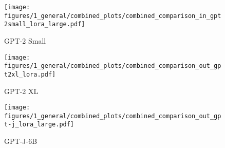 \begin{figure*}[h!]
    \centering
    \begin{subfigure}[t]{0.32\textwidth}
        \centering
        \texttt{[image: figures/1\_general/combined\_plots/combined\_comparison\_in\_gpt2small\_lora\_large.pdf]}
        \caption{GPT-2 Small }
        \label{fig:gpt2small_lora}
    \end{subfigure}
    \begin{subfigure}[t]{0.32\textwidth}
        \centering
        \texttt{[image: figures/1\_general/combined\_plots/combined\_comparison\_out\_gpt2xl\_lora.pdf]}
        \caption{GPT-2 XL }
        \label{fig:gpt2xl_lora}
    \end{subfigure}
    \begin{subfigure}[t]{0.32\textwidth}
        \centering
        \texttt{[image: figures/1\_general/combined\_plots/combined\_comparison\_out\_gpt-j\_lora\_large.pdf]}
        \caption{GPT-J-6B }
        \label{fig:gptj_lora}
    \end{subfigure}
    \caption{Early demonstration of a fundamental pattern we discovered across model sizes: the catastrophic nature of dissonant updates compared to non-dissonant ones. Results shown for GPT-2 Small \ref{fig:gpt2small_lora}, GPT-2 XL \ref{fig:gpt2xl_lora}, and GPT-J-6B \ref{fig:gptj_lora}, comparing full fine-tuning (stars) and LoRA (crosses) approaches. The stark contrast between dissonant ({\color{customred}red}) and non-dissonant ({\color{customgreen}green}) updates persists across model scales and training methods\protect\footnotemark, motivating our systematic investigation into this fundamental challenge of knowledge integration.}
    \label{fig:lora_comparison}
\end{figure*}



